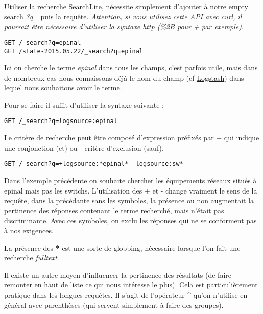 {Utiliser la recherche SearchLite, nécessite simplement d'ajouter à notre
empty search \emph{?q=} puis la requête. 
\emph{Attention, si vous utilisez cette API avec 
curl, \emph{il pourrait être nécessaire d'utiliser la syntaxe http} (\%2B pour + par exemple)}.

\begin{lstlisting}[style=code,label={lst:APIsearchliteexample1},caption={Exemples simples}]
GET /_search?q=epinal
GET /state-2015.05.22/_search?q=epinal
\end{lstlisting}

Ici on cherche le terme \emph{epinal} dans tous les champs, c'est parfois utile,
mais dans de nombreux cas nous connaissons déjà le nom du champ (cf \hyperref[lst:grokregex1]{Logstash}) dans
lequel nous souhaitons avoir le terme. 

Pour se faire il suffit d'utiliser la syntaxe suivante : 
\begin{lstlisting}[style=code,label={lst:APIsearchliteexample2},caption={Choix du champ}]
GET /_search?q=logsource:epinal
\end{lstlisting}

Le critère de recherche peut être composé d'expression préfixés par + qui indique 
une conjonction (et) ou - critère d'exclusion (sauf).

\begin{lstlisting}[style=code,label={lst:APIsearchliteexample3},caption={Conditions must (not) match}]
GET /_search?q=+logsource:*epinal* -logsource:sw*
\end{lstlisting}

Dans l'exemple précédente on souhaite chercher les équipements réseaux situés à epinal
mais pas les switchs.
L'utilisation des + et - change vraiment le sens de la requête, dans la précédante
sans les symboles, la présence ou non augmentait la pertinence des réponses contenant
le terme recherché, mais n'était pas discriminante.
Avec ces symboles, on exclu les réponses qui ne se conforment pas à nos exigences.


La présence des \textbf{*} est une sorte de globbing, nécessaire lorsque l'on fait
une recherche \textit{fulltext}. 


Il existe un autre moyen d'influencer la pertinence des résultats (de faire remonter
en haut de liste ce qui nous intéresse le plus).
Cela est particulièrement pratique dans les longues requêtes.
Il s'agit de l'opérateur \textbf{\^} qu'on n'utilise en général avec
parenthèses (qui servent simplement à faire des groupes).


}

